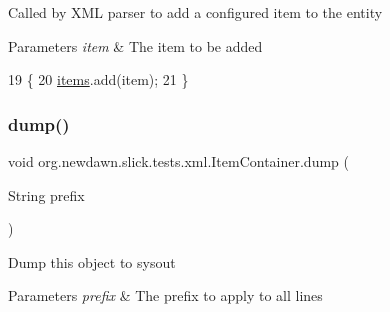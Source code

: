 Called by X\+ML parser to add a configured item to the entity


\begin{DoxyParams}{Parameters}
{\em item} & The item to be added \\
\hline
\end{DoxyParams}

\begin{DoxyCode}
19                                 \{
20         \mbox{\hyperlink{namespaceitems}{items}}.add(item);
21     \}
\end{DoxyCode}
\mbox{\label{classorg_1_1newdawn_1_1slick_1_1tests_1_1xml_1_1_item_container_a4c88e3641269fe73a03a477ccb18fb68}} 
\subsubsection{\texorpdfstring{dump()}{dump()}}
{\footnotesize\ttfamily void org.\+newdawn.\+slick.\+tests.\+xml.\+Item\+Container.\+dump (\begin{DoxyParamCaption}\item[{String}]{prefix }\end{DoxyParamCaption})\hspace{0.3cm}{\ttfamily [inline]}}

Dump this object to sysout


\begin{DoxyParams}{Parameters}
{\em prefix} & The prefix to apply to all lines \\
\hline
\end{DoxyParams}

